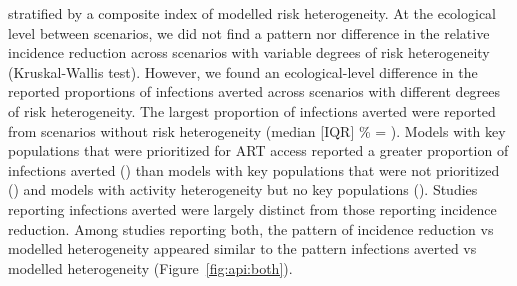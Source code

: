 stratified by a composite index of modelled risk heterogeneity. %
At the ecological level between scenarios, we did not find a pattern nor difference 
in the relative incidence reduction across scenarios with variable degrees of risk heterogeneity (Kruskal-Wallis test). %
However, we found an ecological-level difference in  %
the reported proportions of infections averted across
scenarios with different degrees of risk heterogeneity. %
The largest proportion of infections averted were reported from 
scenarios without risk heterogeneity 
(median [IQR] \% = ).
Models with key populations that were prioritized for ART access reported
a greater proportion of infections averted () than
models with key populations that were not prioritized ()
and models with activity heterogeneity but no key populations
().
Studies reporting infections averted were
largely distinct from those reporting incidence reduction.
Among  studies reporting both,
the pattern of incidence reduction vs modelled heterogeneity
appeared similar to the pattern infections averted vs modelled heterogeneity
(Figure~\ref{fig:api:both}).
